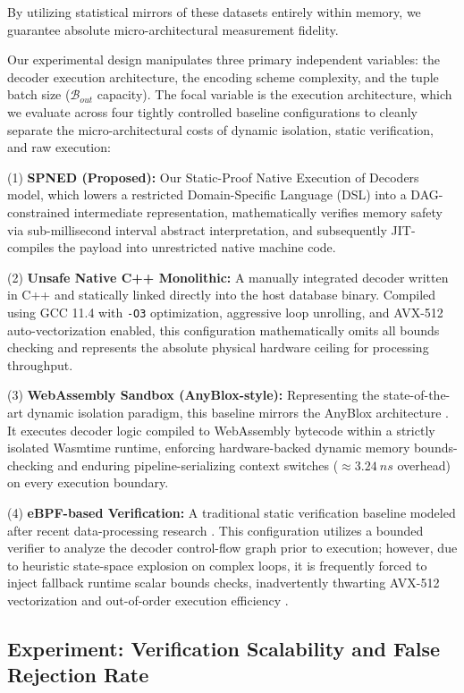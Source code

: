 \documentclass[onecolumn]{IEEEtran}
\numberwithin{equation}{section}
\theoremstyle{definition}
\theoremstyle{remark}
\begin{document}
By utilizing statistical mirrors of these datasets entirely within memory, we guarantee absolute micro-architectural measurement fidelity.

Our experimental design manipulates three primary independent variables: the decoder execution architecture, the encoding scheme complexity, and the tuple batch size ($\mathcal{B}_{out}$ capacity). The focal variable is the execution architecture, which we evaluate across four tightly controlled baseline configurations to cleanly separate the micro-architectural costs of dynamic isolation, static verification, and raw execution:

(1) \textbf{SPNED (Proposed):} Our Static-Proof Native Execution of Decoders model, which lowers a restricted Domain-Specific Language (DSL) into a DAG-constrained intermediate representation, mathematically verifies memory safety via sub-millisecond interval abstract interpretation, and subsequently JIT-compiles the payload into unrestricted native machine code.

(2) \textbf{Unsafe Native C++ Monolithic:} A manually integrated decoder written in C++ and statically linked directly into the host database binary. Compiled using GCC 11.4 with \texttt{-O3} optimization, aggressive loop unrolling, and AVX-512 auto-vectorization enabled, this configuration mathematically omits all bounds checking and represents the absolute physical hardware ceiling for processing throughput.

(3) \textbf{WebAssembly Sandbox (AnyBlox-style):} Representing the state-of-the-art dynamic isolation paradigm, this baseline mirrors the AnyBlox architecture \cite{gienieczko2025anyblox}. It executes decoder logic compiled to WebAssembly bytecode within a strictly isolated Wasmtime runtime, enforcing hardware-backed dynamic memory bounds-checking and enduring pipeline-serializing context switches ($\approx \SI{3.24}{ns}$ overhead) on every execution boundary.

(4) \textbf{eBPF-based Verification:} A traditional static verification baseline modeled after recent data-processing research \cite{hedam2023delilah}. This configuration utilizes a bounded verifier to analyze the decoder control-flow graph prior to execution; however, due to heuristic state-space explosion on complex loops, it is frequently forced to inject fallback runtime scalar bounds checks, inadvertently thwarting AVX-512 vectorization and out-of-order execution efficiency \cite{sun2024finding}.

\subsection{Experiment: Verification Scalability and False Rejection Rate}
\end{document}
